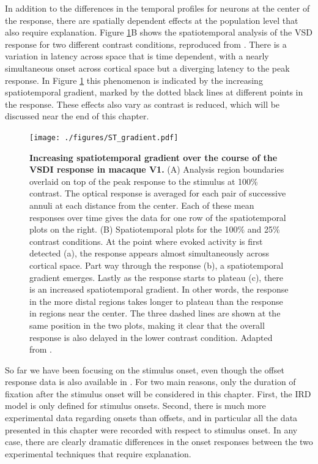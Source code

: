 \documentclass[phd,ianc,twoside]{infthesis}
\begin{document}
In addition to the differences in the temporal profiles for neurons at the center
of the response, there are spatially dependent effects at the population
level that also require explanation. Figure \ref{fig:ST_gradient}B shows
the spatiotemporal analysis of the VSD response for two different
contrast conditions, reproduced from \citet{sit_neuron09}. There is a
variation in latency across space that is time dependent, with a nearly
simultaneous onset across cortical space but a diverging latency to
the peak response. In Figure \ref{fig:ST_gradient} this phenomenon is
indicated by the increasing spatiotemporal gradient, marked by the
dotted black lines at different points in the response.  These effects
also vary as contrast is reduced, which will be discussed near the end of
this chapter.
%
\begin{figure}
\center
\texttt{[image: ./figures/ST\_gradient.pdf]}
\caption{{\bf Increasing spatiotemporal gradient over the course of the
    VSDI response in macaque V1.} (A) Analysis region boundaries overlaid on top of the peak
  response to the stimulus at 100\% contrast. The optical response is
  averaged for each pair of successive annuli at each distance from the
  center. Each of these mean responses over time gives the data for one row of the
  spatiotemporal plots on the right. (B) Spatiotemporal plots for the
  100\% and 25\% contrast conditions. At the point where evoked activity
  is first detected (a), the response appears almost simultaneously
  across cortical space. Part way through the response (b), a
  spatiotemporal gradient emerges. Lastly as the response starts to
  plateau (c), there is an increased spatiotemporal gradient. In
  other words, the response in the more distal regions takes longer to
  plateau than the response in regions near the center.
  The three dashed lines are shown at the same
  position in the two plots, making it clear that the overall response
  is also delayed in the lower contrast condition. Adapted from
  \citet{sit_neuron09}.}
\label{fig:ST_gradient}
\end{figure}

So far we have been focusing on the stimulus onset, even though the offset response
data is also available in \citet{sit_neuron09}. For two main reasons,
only the duration of fixation after the stimulus onset will be
considered in this chapter. First,
the IRD model is only defined for stimulus onsets. Second, there is
much more experimental data regarding onsets than offsets, and in
particular all the data presented in this chapter were recorded with
respect to stimulus onset. In any case, there are clearly dramatic
differences in the onset responses between the two experimental
techniques that require explanation.
\end{document}
